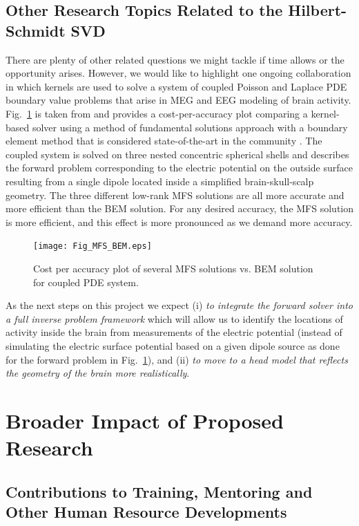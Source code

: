 \documentclass[11pt]{NSFamsart}
\begin{document}
\subsection{Other Research Topics Related to the Hilbert-Schmidt SVD}\label{SecMEEG}
There are plenty of other related questions we might tackle if time allows or the opportunity arises. However, we would like to highlight one ongoing collaboration in which kernels are used to solve a system of coupled Poisson and Laplace PDE boundary value problems that arise in MEG and EEG modeling of brain activity. Fig.~\ref{Fig_MFS_BEM} is taken from \citep{AFFGM13} and provides a cost-per-accuracy plot comparing a kernel-based solver using a method of fundamental solutions approach with a boundary element method that is considered state-of-the-art in the community \citep{fieldtrip11}. The coupled system is solved on three nested concentric spherical shells and describes the forward problem corresponding to the electric potential on the outside surface resulting from a single dipole located inside a simplified brain-skull-scalp geometry. The three different low-rank MFS solutions are all more accurate and more efficient than the BEM solution. For any desired accuracy, the MFS solution is more efficient, and this effect is more pronounced as we demand more accuracy.

\begin{figure}[h]
    \centering
    \texttt{[image: Fig\_MFS\_BEM.eps]}
\caption{Cost per accuracy plot of several MFS solutions vs. BEM solution for coupled PDE system.}\label{Fig_MFS_BEM}
\end{figure}

As the next steps on this project we expect (i) \emph{to integrate the forward solver into a full inverse problem framework} which will allow us to identify the locations of activity inside the brain from measurements of the electric potential (instead of simulating the electric surface potential based on a given dipole source as done for the forward problem in Fig.~\ref{Fig_MFS_BEM}), and (ii) \emph{to move to a head model that reflects the geometry of the brain more realistically}. 

\section{Broader Impact of Proposed Research}\label{SectBroad}


\subsection{Contributions to Training, Mentoring and Other Human Resource Developments}
\end{document}
